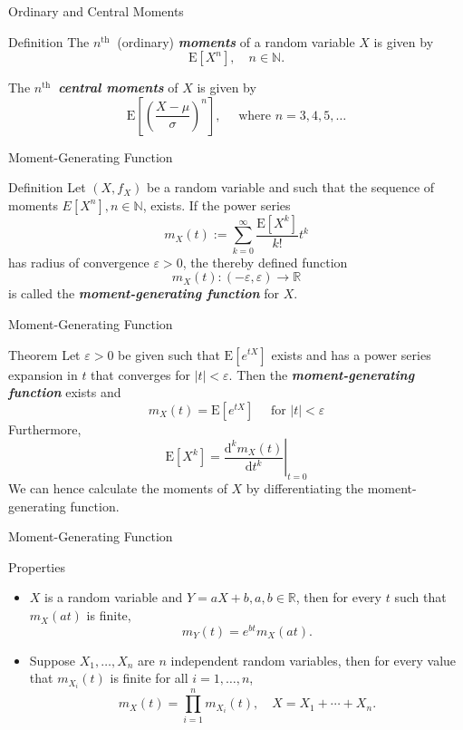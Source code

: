 \documentclass{beamer}
\newcommand{\bb}[1]{\textcolor{antiquefuchsia}{\textbf{\textit{#1}}}}
\begin{document}
\begin{frame}{Ordinary and Central Moments}
\begin{block}{Definition}
The $n^{\text {th }}$ (ordinary) \bb{moments} of a random variable $X$ is given by
$$\mathrm{E}\left[X^{n}\right], \quad n \in \mathbb{N} .$$

The $n^{\text {th }}$ \bb{central moments} of $X$ is given by
$$\mathrm{E}\left[\left(\frac{X-\mu}{\sigma}\right)^{n}\right], \quad \text{ where } n=3,4,5, \ldots$$
\end{block}
\end{frame}

\begin{frame}{Moment-Generating Function}
\begin{block}{Definition}
Let $\left(X, f_{X}\right)$ be a random variable and such that the sequence of moments $E\left[X^{n}\right], n \in \mathbb{N}$, exists. If the power series
$$
m_{X}(t):=\sum_{k=0}^{\infty} \frac{\mathrm{E}\left[X^{k}\right]}{k !} t^{k}
$$
has radius of convergence $\varepsilon>0$, the thereby defined function
$$
m_{X}(t):(-\varepsilon, \varepsilon) \rightarrow \mathbb{R}
$$
is called the \bb{moment-generating function} for $X$.
\end{block}
\end{frame}

\begin{frame}{Moment-Generating Function}
\begin{block}{Theorem}
Let $\varepsilon>0$ be given such that $\mathrm{E}\left[e^{t X}\right]$ exists and has a power series expansion in $t$ that converges for $|t|<\varepsilon$. Then the \bb{moment-generating function} exists and
$$
m_{X}(t)=\mathrm{E}\left[e^{t X}\right] \quad \text { for }|t|<\varepsilon
$$
Furthermore,
$$
\mathrm{E}\left[X^{k}\right]=\left.\frac{\mathrm{d}^{k} m_{X}(t)}{\mathrm{d} t^{k}}\right|_{t=0}
$$
We can hence calculate the moments of $X$ by differentiating the moment-generating function.
\end{block}
\end{frame}

\begin{frame}{Moment-Generating Function}
\begin{block}{Properties}
\begin{itemize}
\item $X$ is a random variable and $Y=a X+b, a, b \in \mathbb{R}$, then for every $t$ such that $m_{X}(a t)$ is finite,
$$
m_{Y}(t)=e^{b t} m_{X}(a t) .
$$
\item Suppose $X_{1}, \ldots, X_{n}$ are $n$ independent random variables, then for every value that $m_{X_{i}}(t)$ is finite for all $i=1, \ldots, n$,
$$
m_{X}(t)=\prod_{i=1}^{n} m_{X_{i}}(t), \quad X=X_{1}+\cdots+X_{n} .
$$
\end{itemize}
\end{block}
\end{frame}
\end{document}
